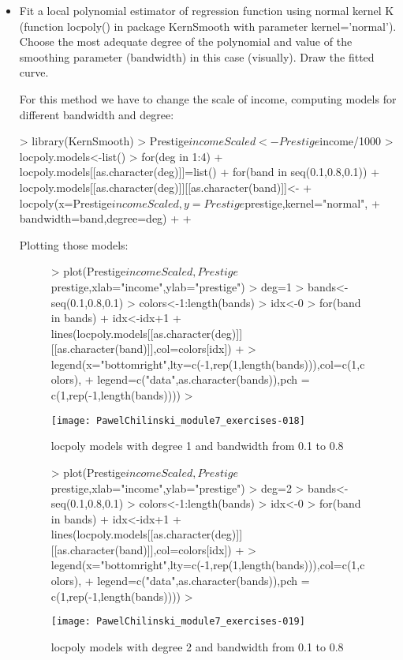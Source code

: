 \documentclass[a4paper]{article}
\begin{document}
\begin{itemize}
\item Fit a local polynomial estimator of regression function using normal
kernel K (function locpoly() in package KernSmooth with parameter
kernel='normal').
Choose the most adequate degree of the polynomial and value of the smoothing parameter (bandwidth) in this case (visually). 
Draw the fitted curve.

For this method we have to change the scale of income, computing models for
different bandwidth and degree:
\begin{Schunk}
\begin{Sinput}
> library(KernSmooth)	
> Prestige$incomeScaled<-Prestige$income/1000
> locpoly.models<-list()
> for(deg in 1:4){
+ 	locpoly.models[[as.character(deg)]]=list()
+ 	for(band in seq(0.1,0.8,0.1)){
+ 		locpoly.models[[as.character(deg)]][[as.character(band)]]<-
+ 				locpoly(x=Prestige$incomeScaled,y=Prestige$prestige,kernel="normal",
+ 						bandwidth=band,degree=deg)		
+ 	}
+ }
\end{Sinput}
\end{Schunk}
Plotting those models:
\begin{figure}[H]
\begin{center}
\begin{Schunk}
\begin{Sinput}
> plot(Prestige$incomeScaled,Prestige$prestige,xlab="income",ylab="prestige")
> deg=1
> bands<-seq(0.1,0.8,0.1)
> colors<-1:length(bands)
> idx<-0
> for(band in bands){
+ 	idx<-idx+1
+ 	lines(locpoly.models[[as.character(deg)]][[as.character(band)]],col=colors[idx])		
+ }
> legend(x="bottomright",lty=c(-1,rep(1,length(bands))),col=c(1,colors), 
+ 		legend=c("data",as.character(bands)),pch = c(1,rep(-1,length(bands))))
> 
\end{Sinput}
\end{Schunk}
\texttt{[image: PawelChilinski\_module7\_exercises-018]}
\caption{locpoly models with degree 1 and bandwidth from 0.1 to 0.8}
\end{center}
\end{figure}

\begin{figure}[H]
\begin{center}
\begin{Schunk}
\begin{Sinput}
> plot(Prestige$incomeScaled,Prestige$prestige,xlab="income",ylab="prestige")
> deg=2
> bands<-seq(0.1,0.8,0.1)
> colors<-1:length(bands)
> idx<-0
> for(band in bands){
+ 	idx<-idx+1
+ 	lines(locpoly.models[[as.character(deg)]][[as.character(band)]],col=colors[idx])		
+ }
> legend(x="bottomright",lty=c(-1,rep(1,length(bands))),col=c(1,colors), 
+ 		legend=c("data",as.character(bands)),pch = c(1,rep(-1,length(bands))))
> 
\end{Sinput}
\end{Schunk}
\texttt{[image: PawelChilinski\_module7\_exercises-019]}
\caption{locpoly models with degree 2 and bandwidth from 0.1 to 0.8}
\end{center}
\end{figure}


\end{itemize}
\end{document}
